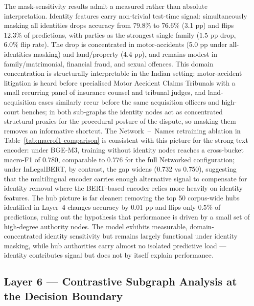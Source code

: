 \documentclass[runningheads]{llncs}
\begin{document}
The mask-sensitivity results admit a measured rather than absolute interpretation. Identity features carry non-trivial test-time signal: simultaneously masking all identities drops accuracy from 79.8\% to 76.6\% (3.1 pp) and flips 12.3\% of predictions, with parties as the strongest single family (1.5 pp drop, 6.0\% flip rate). The drop is concentrated in motor-accidents (5.0 pp under all-identities masking) and land/property (4.4 pp), and remains modest in family/matrimonial, financial fraud, and sexual offences. This domain concentration is structurally interpretable in the Indian setting: motor-accident litigation is heard before specialised Motor Accident Claims Tribunals with a small recurring panel of insurance counsel and tribunal judges, and land-acquisition cases similarly recur before the same acquisition officers and high-court benches; in both sub-graphs the identity nodes act as concentrated structural proxies for the procedural posture of the dispute, so masking them removes an informative shortcut. The Network~--~Names retraining ablation in Table~\ref{tab:macrof1-comparison} is consistent with this picture for the strong text encoder: under BGE-M3, training without identity nodes reaches a cross-bucket macro-F1 of 0.780, comparable to 0.776 for the full Networked configuration; under InLegalBERT, by contrast, the gap widens (0.732 vs 0.750), suggesting that the multilingual encoder carries enough alternative signal to compensate for identity removal where the BERT-based encoder relies more heavily on identity features. The hub picture is far cleaner: removing the top 50 corpus-wide hubs identified in Layer~4 changes accuracy by 0.01 pp and flips only 0.5\% of predictions, ruling out the hypothesis that performance is driven by a small set of high-degree authority nodes. The model exhibits measurable, domain-concentrated identity sensitivity but remains largely functional under identity masking, while hub authorities carry almost no isolated predictive load --- identity contributes signal but does not by itself explain performance.

\subsection{Layer 6 --- Contrastive Subgraph Analysis at the Decision Boundary}
\label{subsec:exp-boundary}
\end{document}
